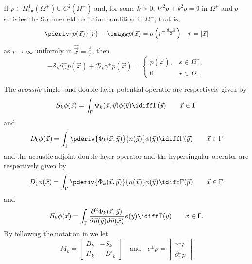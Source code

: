 \begin{theorem}\label{Thm:ExteriorProblem}
	If $p\in H_{\mathrm{loc}}^1(\Omega^+)\cup C^2(\Omega^+)$ and, for some $k > 0$, $\nabla^2 p + k^2 p = 0$ in $\Omega^+$ and $p$ satisfies the Sommerfeld radiation condition in $\Omega^+$, that is,
\begin{equation*}
	\pderiv{p(\vec{x})}{r}-\imag k p(\vec{x}) = o\left(r^{-\frac{d-1}{2}}\right)\quad r=|\vec{x}|
\end{equation*}	
	as $r\to\infty$ uniformly in $\hat{\vec{x}}=\frac{\vec{x}}{r}$, then
\begin{equation*}
		-\mathcal{S}_k\partial_n^+ p(\vec{x}) + \mathcal{D}_k\gamma^+ p(\vec{x}) = \begin{cases} p(\vec{x}), & x\in\Omega^+,\\
		0 & x\in\Omega^-.\end{cases}
\end{equation*}	 
\end{theorem}
The \textit{acoustic} single- and double layer potential operator are respectively given by
\begin{equation*}
	S_k \phi(\vec{x}) = \int_\Gamma \Phi_k(\vec{x},\vec{y}) \phi(\vec{y}) \idiff\Gamma(\vec{y})\qquad \vec{x}\in\Gamma
\end{equation*}
and
\begin{equation*}
	D_k \phi(\vec{x}) = \int_\Gamma \pderiv{\Phi_k(\vec{x},\vec{y})}{n(\vec{y})} \phi(\vec{y}) \idiff\Gamma(\vec{y})\qquad \vec{x}\in\Gamma
\end{equation*}
and the  acoustic adjoint double-layer operator and the hypersingular operator are respectively given by
\begin{equation*}
	D'_k \phi(\vec{x}) = \int_\Gamma \pderiv{\Phi_k(\vec{x},\vec{y})}{n(\vec{x})} \phi(\vec{y}) \idiff\Gamma(\vec{y})\qquad \vec{x}\in\Gamma
\end{equation*}
and
\begin{equation*}
	H_k \phi(\vec{x}) = \int_\Gamma \frac{\partial^2\Phi_k(\vec{x},\vec{y})}{\partial\vec{n}(\vec{y})\partial\vec{n}(\vec{x})} \phi(\vec{y}) \idiff\Gamma(\vec{y})\qquad \vec{x}\in\Gamma.
\end{equation*}
By following the notation in \cite[p. 117]{Chandler_Wilde2012nab} we let
\begin{equation*}
	M_k = \begin{bmatrix}
		D_k & -S_k\\
		H_k & -D'_k
	\end{bmatrix}\quad\text{and}\quad c^\pm p = \begin{bmatrix}
		\gamma^\pm p\\
		\partial_n^\pm p
	\end{bmatrix}
\end{equation*}
